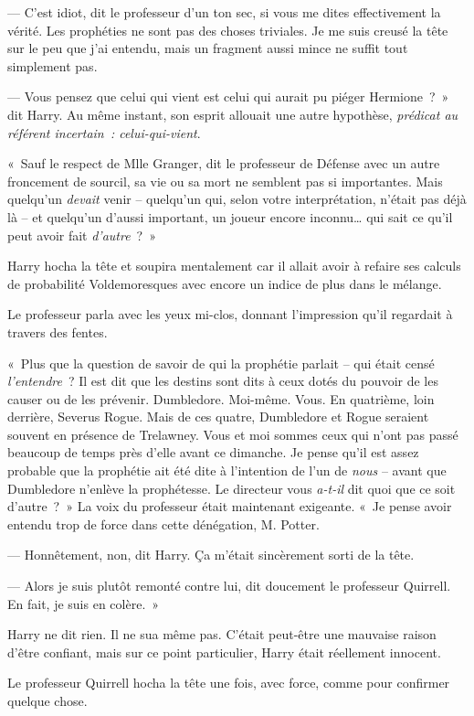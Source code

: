 --- C'est idiot, dit le professeur d'un ton sec, si vous me dites effectivement la vérité.
Les prophéties ne sont pas des choses triviales.
Je me suis creusé la tête sur le peu que j'ai entendu, mais un fragment aussi mince ne suffit tout simplement pas.

--- Vous pensez que celui qui vient est celui qui aurait pu piéger Hermione~?~»
dit Harry.
Au même instant, son esprit allouait une autre hypothèse, \emph{prédicat au référent incertain~: celui-qui-vient}.

«~Sauf le respect de Mlle Granger, dit le professeur de Défense avec un autre froncement de sourcil, sa vie ou sa mort ne semblent pas si importantes.
Mais quelqu'un \emph{devait} venir -- quelqu'un qui, selon votre interprétation, n'était pas déjà là -- et quelqu'un d'aussi important, un joueur encore inconnu… qui sait ce qu'il peut avoir fait \emph{d'autre}~?~»

Harry hocha la tête et soupira mentalement car il allait avoir à refaire ses calculs de probabilité Voldemoresques avec encore un indice de plus dans le mélange.

Le professeur parla avec les yeux mi-clos, donnant l'impression qu'il regardait à travers des fentes.

«~Plus que la question de savoir de qui la prophétie parlait -- qui était censé \emph{l'entendre}~?
Il est dit que les destins sont dits à ceux dotés du pouvoir de les causer ou de les prévenir.
Dumbledore.
Moi-même.
Vous. En quatrième, loin derrière, Severus Rogue.
Mais de ces quatre, Dumbledore et Rogue seraient souvent en présence de Trelawney.
Vous et moi sommes ceux qui n'ont pas passé beaucoup de temps près d'elle avant ce dimanche.
Je pense qu'il est assez probable que la prophétie ait été dite à l'intention de l'un de \emph{nous} -- avant que Dumbledore n'enlève la prophétesse.
Le directeur vous \emph{a-t-il} dit quoi que ce soit d'autre~?~»
La voix du professeur était maintenant exigeante.
«~Je pense avoir entendu trop de force dans cette dénégation, M. Potter.

--- Honnêtement, non, dit Harry.
Ça m'était sincèrement sorti de la tête.

--- Alors je suis plutôt remonté contre lui, dit doucement le professeur Quirrell.
En fait, je suis en colère.~»

Harry ne dit rien.
Il ne sua même pas.
C'était peut-être une mauvaise raison d'être confiant, mais sur ce point particulier, Harry était réellement innocent.

Le professeur Quirrell hocha la tête une fois, avec force, comme pour confirmer quelque chose.


